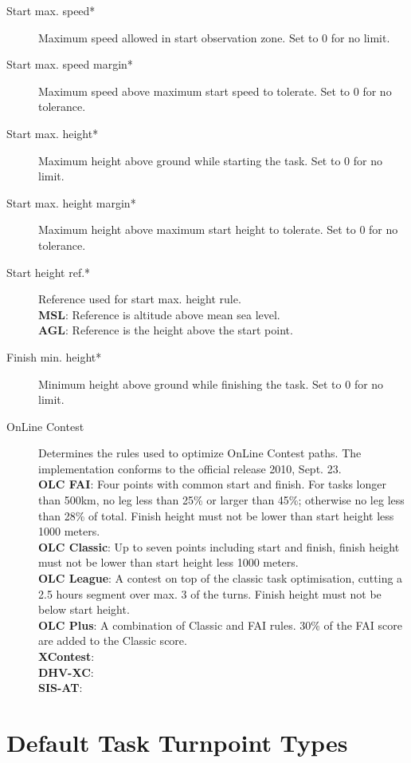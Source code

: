 \begin{description}
\item[Start max. speed*]  Maximum speed allowed in start observation zone.  Set 
  to 0 for no limit.
\item[Start max. speed margin*] Maximum speed above maximum start speed to tolerate. 
  Set to 0 for no tolerance.
\item[Start max. height*]  Maximum height above ground while starting the task. 
  Set to 0 for no limit.
\item[Start max. height margin*]  Maximum height above maximum start height to 
  tolerate.  Set to 0 for no tolerance.
\item[Start height ref.*]  Reference used for start max. height rule. \\
  {\bf MSL}: Reference is altitude above mean sea level. \\
  {\bf AGL}: Reference is the height above the start point.
\item[Finish min. height*]  Minimum height above ground while finishing the task. 
  Set to 0 for no limit. 
\item[OnLine Contest] Determines the rules used to optimize OnLine Contest 
  paths.  The implementation  conforms to the official release 2010, Sept. 23. \\
  {\bf OLC FAI}: Four points with common start and finish.  For tasks longer than
  500km, no leg less than 25\% or larger than 45\%; otherwise no leg less than 28\% 
  of total.  Finish height must not be lower than start height less 1000 meters. \\
  {\bf OLC Classic}: Up to seven points including start and finish, finish height
  must not be lower than start height less 1000 meters. \\
  {\bf OLC League}: A contest on top of the classic task optimisation, cutting
  a 2.5 hours segment over max. 3 of the turns. Finish height must not be below
  start height. \\
  {\bf OLC Plus}: A combination of Classic and FAI rules. 30\% of the FAI score
  are added to the Classic score. \\
  {\bf XContest}:  \\
  {\bf DHV-XC}:  \\
  {\bf SIS-AT}:  \\
\end{description}


\section{Default Task Turnpoint Types}

